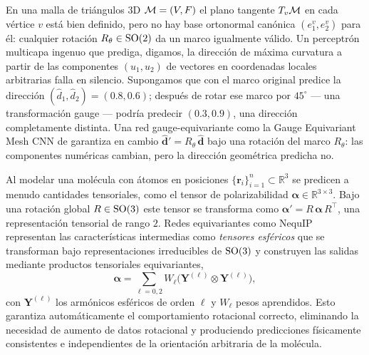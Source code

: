 \begin{example}
\label{ex:gauge:mesh}
En una malla de tri\'angulos $3$D $\mathcal{M} = (V, F)$ el plano tangente $T_v\mathcal{M}$ en
cada v\'ertice $v$ est\'a bien definido, pero no hay base ortonormal can\'onica
$(e_1^v, e_2^v)$ para \'el: cualquier rotaci\'on $R_\theta \in \operatorname{SO}(2)$ da un marco
igualmente v\'alido. Un perceptr\'on multicapa ingenuo que prediga, digamos, la
direcci\'on de m\'axima curvatura a partir de las componentes $(u_1, u_2)$ de
vectores en coordenadas locales arbitrarias falla en silencio. Supongamos que con
el marco original predice la direcci\'on $(\hat d_1, \hat d_2) = (0.8, 0.6)$;
despu\'es de rotar ese marco por $45^\circ$ --- una transformaci\'on gauge ---
podr\'ia predecir $(0.3, 0.9)$, una direcci\'on completamente distinta. Una red
gauge-equivariante como la Gauge Equivariant Mesh CNN de
\citet{cohen2019gaugeequivariantconvolutional} garantiza en cambio
$\hat{\mathbf{d}}' = R_\theta\,\hat{\mathbf{d}}$ bajo una rotaci\'on del marco
$R_\theta$: las componentes num\'ericas cambian, pero la direcci\'on geom\'etrica
predicha no.
\end{example}

\begin{example}
\label{ex:gauge:molecules}
Al modelar una mol\'ecula con \'atomos en posiciones $\{\mathbf{r}_i\}_{i=1}^n
\subset \mathbb{R}^3$ se predicen a menudo cantidades tensoriales, como el tensor
de polarizabilidad $\boldsymbol{\alpha} \in \mathbb{R}^{3\times 3}$. Bajo una
rotaci\'on global $R \in \operatorname{SO}(3)$ este tensor se transforma como
$\boldsymbol{\alpha}' = R\, \boldsymbol{\alpha}\, R^{\!\top}$, una representaci\'on
tensorial de rango $2$. Redes equivariantes como NequIP~\citep{batzner2022nequip}
representan las caracter\'isticas intermedias como \emph{tensores esf\'ericos} que
se transforman bajo representaciones irreducibles de $\operatorname{SO}(3)$ y construyen las
salidas mediante productos tensoriales equivariantes,
\[
  \boldsymbol{\alpha} = \sum_{\ell = 0, 2} W_\ell \big(\mathbf{Y}^{(\ell)} \otimes
  \mathbf{Y}^{(\ell)}\big),
\]
con $\mathbf{Y}^{(\ell)}$ los arm\'onicos esf\'ericos de orden $\ell$ y $W_\ell$
pesos aprendidos. Esto garantiza autom\'aticamente el comportamiento rotacional
correcto, eliminando la necesidad de aumento de datos rotacional y produciendo
predicciones f\'isicamente consistentes e independientes de la orientaci\'on
arbitraria de la mol\'ecula.
\end{example}

